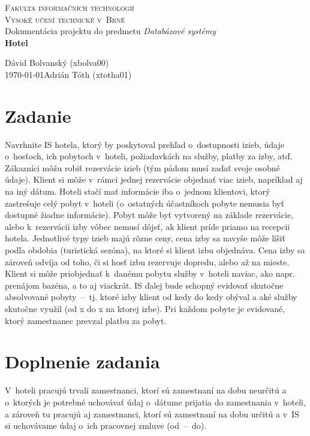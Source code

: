 \documentclass[a4paper,11pt,titlepage]{article}[11.3.2016]
\begin{document}
\begin{titlepage}
	\begin{center}
		{\Huge\textsc{Fakulta informačních technologií\\
		Vysoké učení technické v~Brně}}\\
	    {\LARGE{Dokumentácia projektu do predmetu \textit{Databázové systémy}\\
		 \vspace{5mm}
		 \Huge\textbf{{Hotel}}}}
	\end{center}
	{\Large \hfill Dávid Bolvanský (xbolva00)\\
	\today \hfill Adrián Tóth (xtotha01)}
\end{titlepage}

\section*{Zadanie} 
Navrhnite IS hotela, ktorý by poskytoval prehľad o~dostupnosti izieb, údaje o~hosťoch, ich pobytoch v~hoteli, požiadav\-kách na služby, platby za izby, atď. Zákazníci môžu robiť rezervácie izieb (tým pádom musí zadať svoje osobné údaje). Klient si môže v~rámci jednej rezervácie objednať viac izieb, napríklad aj na iný dátum. Hoteli stačí mať informácie iba o~jednom klientovi, ktorý zastrešuje celý pobyt v~hoteli (o~ostatných účastníkoch pobyte nemusia byť dostupné žiadne informácie). Pobyt môže byť vytvorený na základe rezervácie, alebo k~rezervácii izby vôbec nemusí dôjsť, ak klient príde priamo na recepcii hotela. Jednotlivé typy izieb majú rôzne ceny, cena izby sa navyše môže líšiť podľa obdobia (turistická sezóna), na ktoré si klient izbu objednáva. Cena izby sa zároveň odvíja od toho, či si hosť izbu rezervuje dopredu, alebo až na mieste. Klient si môže priobjednať k~danému pobytu služby v~hoteli naviac, ako napr. prenájom bazéna, a to aj viackrát. IS ďalej bude schopný evidovať skutočne absolvované pobyty \,--\, tj. ktoré izby klient od kedy do kedy obýval a aké služby skutočne využil (od x do x na ktorej izbe). Pri každom pobyte je evidované, ktorý zamestnanec prevzal platbu za pobyt.

\section*{Doplnenie zadania} 
V~hoteli pracujú trvalí zamestnanci, ktorí sú zamestnaní na dobu neurčitú a o~ktorých je potrebné uchovávať údaj o~dátume prijatia do zamestnania v~hoteli, a zároveň tu pracujú aj zamestnanci, ktorí sú zamestnaní na dobu určitú a v~IS si uchovávame údaj o~ich pracovnej zmluve (od \,--\, do).
\end{document}
